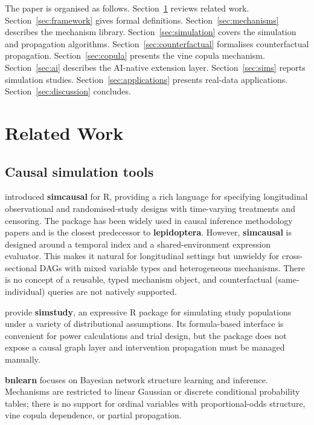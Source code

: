 \documentclass[12pt,a4paper]{article}
\newcommand{\pkg}[1]{\textbf{#1}}
\begin{document}
The paper is organised as follows. Section~\ref{sec:related} reviews related work. Section~\ref{sec:framework} gives formal definitions. Section~\ref{sec:mechanisms} describes the mechanism library. Section~\ref{sec:simulation} covers the simulation and propagation algorithms. Section~\ref{sec:counterfactual} formalises counterfactual propagation. Section~\ref{sec:copula} presents the vine copula mechanism. Section~\ref{sec:ai} describes the AI-native extension layer. Section~\ref{sec:sims} reports simulation studies. Section~\ref{sec:applications} presents real-data applications. Section~\ref{sec:discussion} concludes.

\section{Related Work}
\label{sec:related}

\subsection{Causal simulation tools}

\citet{sofrygin2017simcausal} introduced \pkg{simcausal} for R, providing a rich language for specifying longitudinal observational and randomised-study designs with time-varying treatments and censoring. The package has been widely used in causal inference methodology papers \citep{luedtke2016, laan2018} and is the closest predecessor to \pkg{lepidoptera}. However, \pkg{simcausal} is designed around a temporal index and a shared-environment expression evaluator. This makes it natural for longitudinal settings but unwieldy for cross-sectional DAGs with mixed variable types and heterogeneous mechanisms. There is no concept of a reusable, typed mechanism object, and counterfactual (same-individual) queries are not natively supported.

\citet{goldfeld2020simstudy} provide \pkg{simstudy}, an expressive R package for simulating study populations under a variety of distributional assumptions. Its formula-based interface is convenient for power calculations and trial design, but the package does not expose a causal graph layer and intervention propagation must be managed manually.

\pkg{bnlearn} \citep{scutari2010bnlearn} focuses on Bayesian network structure learning and inference. Mechanisms are restricted to linear Gaussian or discrete conditional probability tables; there is no support for ordinal variables with proportional-odds structure, vine copula dependence, or partial propagation.
\end{document}
